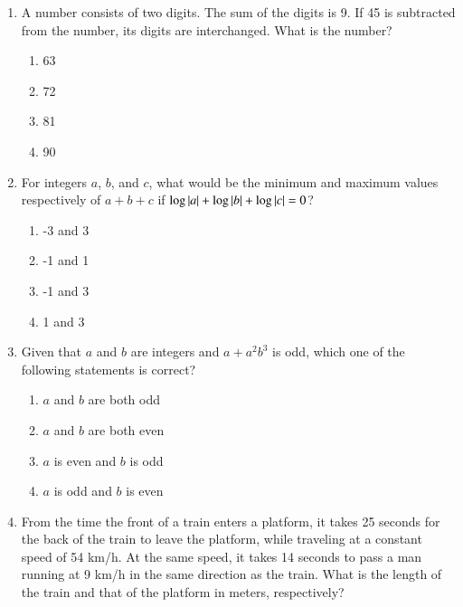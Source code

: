 \documentclass[journal,9pt,onecolumn]{IEEEtran}
\begin{document}
\begin{enumerate}
\item A number consists of two digits. The sum of the digits is 9. If 45 is subtracted from the number, its digits are interchanged. What is the number? \hfill {}

\begin{multicols}{4}
\begin{enumerate}
    \item 63
    \item 72
    \item 81
    \item 90
\end{enumerate}
\end{multicols}

\item For integers $a$, $b$, and $c$, what would be the minimum and maximum values respectively of $a + b + c$ if $\log \left\vert a\right\vert + \log \left\vert b\right\vert + \log \left\vert c\right\vert = 0$?\hfill {}

\begin{multicols}{4}
\begin{enumerate}
    \item -3 and 3
    \item -1 and 1
    \item -1 and 3
    \item 1 and 3
\end{enumerate}
\end{multicols}

\item Given that $a$ and $b$ are integers and $a + a^2 b^3$ is odd, which one of the following statements is correct? \hfill {}

\begin{multicols}{2}
\begin{enumerate}
    \item $a$ and $b$ are both odd
    \item $a$ and $b$ are both even
    \item $a$ is even and $b$ is odd
    \item $a$ is odd and $b$ is even
\end{enumerate}
\end{multicols}


\item From the time the front of a train enters a platform, it takes 25 seconds for the back of the train to leave the platform, while traveling at a constant speed of 54 km/h. At the same speed, it takes 14 seconds to pass a man running at 9 km/h in the same direction as the train. What is the length of the train and that of the platform in meters, respectively? \hfill {}


\end{enumerate}
\end{document}
